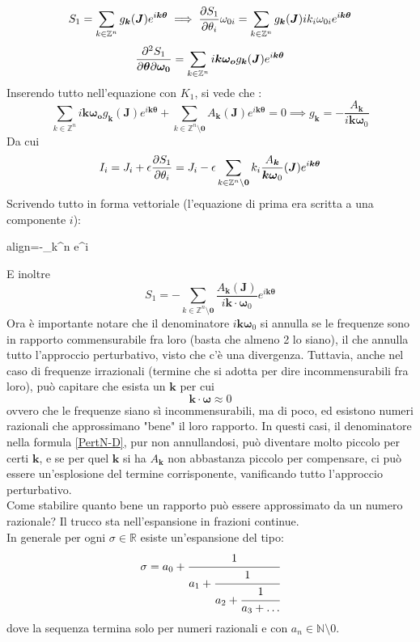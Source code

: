 \documentclass[a4paper,12pt]{article}
\renewcommand{\arg}[1]{_{(#1)}}
\newcommand{\boxedeq}[2]{\begin{empheq}[box={\fboxsep=6pt\fbox}]{align}\label{#1}#2\end{empheq}}
\theoremstyle{plain}
\renewcommand{\vec}[1]{{\boldsymbol{#1}}}
\theoremstyle{definition}
\newcommand{\f}[2]{\frac{#1}{#2}}
\theoremstyle{remark}
\begin{document}
\[S_1=	\sum_{k\in\mathbb{Z}^n}	g_{\vec{k}}	(\vec{J})	e^{i \vec{k}\vec{\theta}	}\implies \pdv{S_1}{\theta_i}\omega_{0i}=\sum_{k\in\mathbb{Z}^n}	{g_{\vec{k}}	(\vec{J})}{i {k_i}\omega_{0i}}	e^{i \vec{k}\vec{\theta}	}\]\[\pdv{S_1}{\vec{\theta}}\vec{\omega_0}=\sum_{k\in\mathbb{Z}^n}{i\vec{k}\vec{\omega_o}}	g_{\vec{k}}	(\vec{J})	e^{i \vec{k}\vec{\theta}	}\]
Inserendo tutto nell'equazione con $K_1$, si vede che :
\[\sum_{k\in\mathbb{Z}^n}{i\vec{k}\vec{\omega_o}}	g_{\vec{k}}	(\vec{J})	e^{i \vec{k}\vec{\theta}	}+	\sum_{k\in\mathbb{Z}^n\setminus\vec{0}}	A_{\vec{k}}	(\vec{J})	e^{i \vec{k}\vec{\theta}	}=0	\implies g_{\vec{k}}=-\f{A_{\vec{k}}}{i\vec{k}\vec{\omega}_0}	\]
Da cui
\[I_i=J_i+\epsilon\pdv{S_1}{\theta_i}=J_i-\epsilon		\sum_{k\in\mathbb{Z}^n\setminus \vec{0}}k_i\f{{A_{\vec{k}}}}{\vec{k}\vec{\omega}_0}(\vec{J})	e^{i \vec{k}\vec{\theta}	}	\]
Scrivendo tutto in forma vettoriale (l'equazione di prima era scritta a una componente $i$):
\boxedeq{PertN-D}{\vec{I}=\vec{J}-\epsilon		\sum_{k\in{}^n\setminus \vec{0}}\vec{k}\f{{A_{\vec{k}}}\arg{\vec{J}}}{\vec{k}\cdot\vec{\omega}_0}	e^{i \vec{k}\vec{\theta}	}}
E inoltre \[S_1=-	\sum_{k\in\mathbb{Z}^n\setminus\vec{0}}	\f{A_{\vec{k}}(\vec{J})}{i\vec{k}\cdot\vec{\omega}_0}	e^{i \vec{k}\vec{\theta}	}\]
Ora è importante notare che il denominatore ${i\vec{k}\vec{\omega}_0}$ si annulla se le frequenze sono in rapporto commensurabile fra loro (basta che almeno 2 lo siano), il che annulla tutto l'approccio perturbativo, visto che c'è una divergenza.
Tuttavia, anche nel caso di frequenze irrazionali (termine che si adotta per dire incommensurabili fra loro), può capitare che esista un $\vec{k}$ per cui
\[\vec{k}\cdot\vec{\omega}\approx0\]
ovvero che le frequenze siano sì incommensurabili, ma di poco, ed esistono numeri razionali che approssimano "bene" il loro rapporto. In questi casi, il denominatore nella formula \ref{PertN-D}, pur non annullandosi, può diventare molto piccolo per certi $\vec{k}$, e se per quel $\vec{k}$ si ha $A_{\vec{k}}$ non abbastanza piccolo per compensare, ci può essere un'esplosione del termine corrisponente, vanificando tutto l'approccio perturbativo.\\ Come stabilire quanto bene un rapporto può essere approssimato da un numero razionale? Il trucco sta nell'espansione in frazioni continue.\\
In generale per ogni $\sigma\in\mathbb{R}$ esiste un'espansione del tipo:
 \[\sigma=a_0+\cfrac{1}{a_1+\cfrac{1}{a_2+\cfrac{1}{a_3+\ldots}}}\]
 dove la sequenza termina solo per numeri razionali e con $a_n\in\mathbb{N}\setminus 0$.\\
\end{document}
